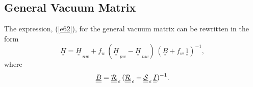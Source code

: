 \documentclass[12pt,prb,aps,notitlepage]{revtex4-1}
\begin{document}
\subsection{General Vacuum Matrix}
The expression, (\ref{e62}), for the general vacuum matrix can be rewritten in the form 
\begin{equation}\label{e130}
\underline{\underline{H}} = \underline{\underline{H}}_{\,nw} + f_w\,( \underline{\underline{H}}_{\,pw} - \underline{\underline{H}}_{\,nw} )\,(\underline{\underline{B}}+f_w\,\underline{\underline{1}})^{-1},
\end{equation}
where
\begin{equation}
\underline{\underline{B}}= \underline{\underline{\cal R}}_{\,\epsilon}\,(\underline{\underline{\cal R}}_{\,\epsilon} + \underline{\underline{\cal S}}_{\,\epsilon}\,\underline{\underline{I}})^{-1}.
\end{equation}
\end{document}
